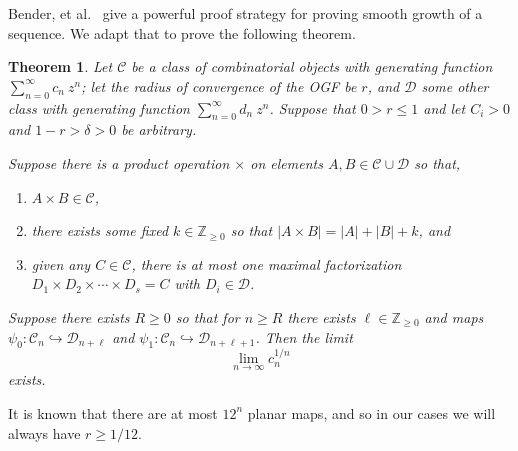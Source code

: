 \documentclass[amsmath,longbibliography,secnumarabic,floatfix,amssymb,nofootinbib,nobibnotes,letterpaper,11pt,notitlepage,tightenlines]{revtex4-1}
\newcommand{\Z}{\mathbb{Z}} \newcommand{\N}{\mathbb{N}}
\newcommand{\ArbClass}{\mathscr{C}}
\newcommand{\ArbSubClass}{\mathscr{D}}
\newcommand{\arbsubclass}{d}
\newcommand{\arbclass}{c}
\newtheorem{theorem}{Theorem}
\begin{document}
Bender, et al.\ \cite{Bender1992104} give a powerful proof strategy for proving smooth growth of a
sequence. We adapt that to prove the following theorem.

\begin{theorem}
  Let $\ArbClass$ be a class of combinatorial objects with generating function
  $\sum_{n=0}^{\infty}{\arbclass_n~z^n}$; let the radius of convergence of the OGF be $r$, and
  $\ArbSubClass$ some other class with generating function
  $\sum_{n=0}^{\infty}{\arbsubclass_n~z^n}$. Suppose that $0 > r \le 1$ and let $C_i > 0$ and
  $1-r>\delta>0$ be arbitrary.

  Suppose there is a product operation $\times$ on elements $A, B \in
  \ArbClass \cup \ArbSubClass$ so that,
  \begin{enumerate}
  \item $A \times B \in \ArbClass$,
  \item there exists some fixed $k \in \Z_{\ge 0}$ so that $|A \times B| = |A| + |B| + k$, and
  \item given any $C \in \ArbClass$, there is at most one maximal factorization $D_1 \times D_2 \times
    \cdots \times D_s = C$ with $D_i \in \ArbSubClass$.
  \end{enumerate}
  Suppose there exists $R \ge 0$ so that for $n \ge R$ there exists $\ell \in \Z_{\ge 0}$ and maps $\psi_0:
  \ArbClass_n \hookrightarrow \ArbSubClass_{n+\ell}$ and $ \psi_1: \ArbClass_n \hookrightarrow
  \ArbSubClass_{n+\ell+1}$. Then the limit
  \[ \lim_{n\to\infty}{\arbclass_n^{1/n}} \] exists.
\end{theorem}

It is known that there are at most $12^n$ planar maps, and so in our cases we will always have $r
\ge 1/12$.
\end{document}
